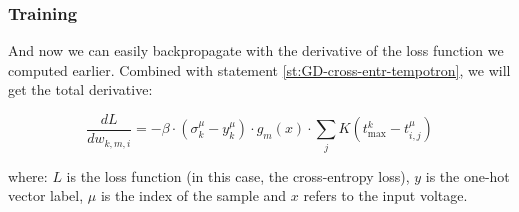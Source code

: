 \subsubsection{Training}

And now we can easily backpropagate with the derivative of the loss function we computed earlier. Combined with statement \ref{st:GD-cross-entr-tempotron}, we will get the total derivative:

\begin{equation}
    \frac{dL}{dw_{k,m,i}} = -\beta \cdot (\sigma_k^\mu - y_k^\mu) \cdot g_m(x) \cdot \sum_j K (t_{\text{max}}^k - t_{i,j}^\mu)
\end{equation}

where:
$L$ is the loss function (in this case, the cross-entropy loss),
$y$ is the one-hot vector label,
$\mu$ is the index of the sample and
$x$ refers to the input voltage.
